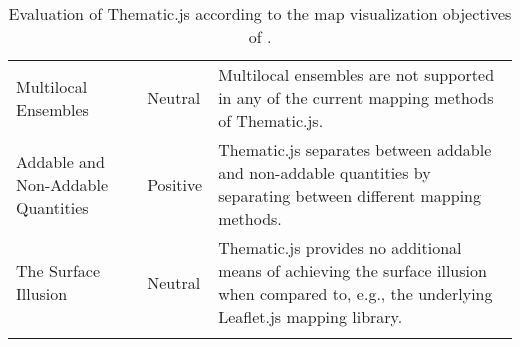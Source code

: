 \begin{longtable}{|p{3cm}|p{2.5cm}|p{7.5cm}|}
Multilocal Ensembles & Neutral &  Multilocal ensembles are not supported in any of the current mapping methods of Thematic.js. \\[0.5em]
Addable and Non-Addable Quantities & Positive & Thematic.js separates between addable and non-addable quantities by separating between different mapping methods. \\[0.5em]
The Surface Illusion & Neutral & Thematic.js provides no additional means of achieving the surface illusion when compared to, e.g., the underlying Leaflet.js mapping library. \\[0.5em]
\hline
\caption{Evaluation of Thematic.js according to the map visualization objectives of \citet{schlichtmann_visualization_2002}.}
\label{table:objectivesevaluation}
\end{longtable}